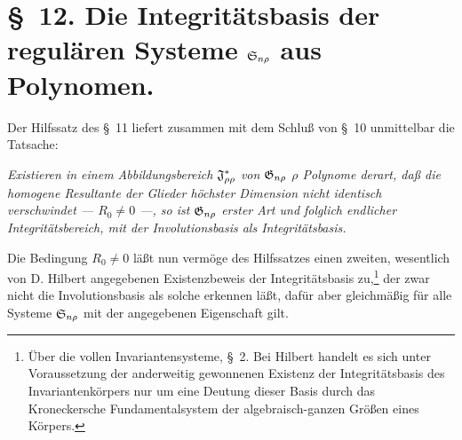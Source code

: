 \section*{\S\ 12. Die Integritätsbasis der regulären Systeme $\mathfrak{S}_{n\rho}$ aus Polynomen.}

Der Hilfssatz des \S\ 11 liefert zusammen mit dem Schluß von \S\ 10 unmittelbar die Tatsache:

\emph{Existieren in einem Abbildungsbereich $\mathfrak{J}^*_{\rho\rho}$ von $\mathfrak{G}_{n\rho}$ $\rho$ Polynome derart, daß die homogene Resultante der Glieder höchster Dimension nicht identisch verschwindet --- $R_0\ne0$ ---, so ist $\mathfrak{G}_{n\rho}$ erster Art und folglich endlicher Integritätsbereich, mit der Involutionsbasis als Integritätsbasis.}

Die Bedingung $R_0\ne0$ läßt nun vermöge des Hilfssatzes einen zweiten, wesentlich von D. Hilbert angegebenen Existenzbeweis der Integritätsbasis zu,\footnote{Über die vollen Invariantensysteme, \S\ 2. Bei Hilbert handelt es sich unter Voraussetzung der anderweitig gewonnenen Existenz der Integritätsbasis des Invariantenkörpers nur um eine Deutung dieser Basis durch das Kroneckersche Fundamentalsystem der algebraisch-ganzen Größen eines Körpers.} der zwar nicht die Involutionsbasis als solche erkennen läßt, dafür aber gleichmäßig für alle Systeme $\mathfrak{S}_{n\rho}$ mit der angegebenen Eigenschaft gilt.

